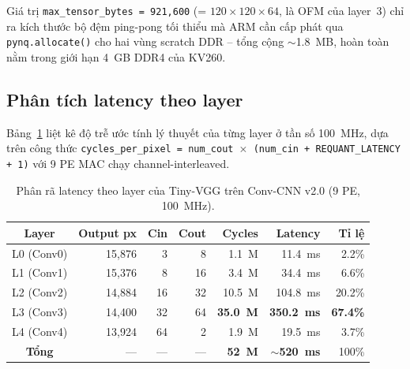 Giá trị \texttt{max\_tensor\_bytes = 921{,}600} (= $120 \times 120 \times 64$, là OFM của layer~3) chỉ ra kích thước bộ đệm ping-pong tối thiểu mà ARM cần cấp phát qua \texttt{pynq.allocate()} cho hai vùng scratch DDR -- tổng cộng $\sim$1.8~MB, hoàn toàn nằm trong giới hạn 4~GB DDR4 của KV260.

\subsection{Phân tích latency theo layer}

Bảng~\ref{tab:latency-per-layer} liệt kê độ trễ ước tính lý thuyết của từng layer ở tần số 100~MHz, dựa trên công thức \texttt{cycles\_per\_pixel = num\_cout $\times$ (num\_cin + REQUANT\_LATENCY + 1)} với 9 PE MAC chạy channel-interleaved.

\begin{table}[H]
    \centering
    \caption{Phân rã latency theo layer của Tiny-VGG trên Conv-CNN v2.0 (9 PE, 100~MHz).}
    \label{tab:latency-per-layer}
    \begin{tabular}{|c|r|r|r|r|r|r|}
        \hline
        \textbf{Layer} & \textbf{Output px} & \textbf{Cin} & \textbf{Cout} & \textbf{Cycles} & \textbf{Latency} & \textbf{Tỉ lệ} \\
        \hline
        L0 (Conv0) & 15{,}876 &  3 &  8 &  1.1~M &  11.4~ms &  2.2\% \\
        L1 (Conv1) & 15{,}376 &  8 & 16 &  3.4~M &  34.4~ms &  6.6\% \\
        L2 (Conv2) & 14{,}884 & 16 & 32 & 10.5~M & 104.8~ms & 20.2\% \\
        L3 (Conv3) & 14{,}400 & 32 & 64 & \textbf{35.0~M} & \textbf{350.2~ms} & \textbf{67.4\%} \\
        L4 (Conv4) & 13{,}924 & 64 &  2 &  1.9~M &  19.5~ms &  3.7\% \\
        \hline
        \textbf{Tổng} & --- & --- & --- & \textbf{52~M} & \textbf{$\sim$520~ms} & 100\% \\
        \hline
    \end{tabular}
\end{table}

